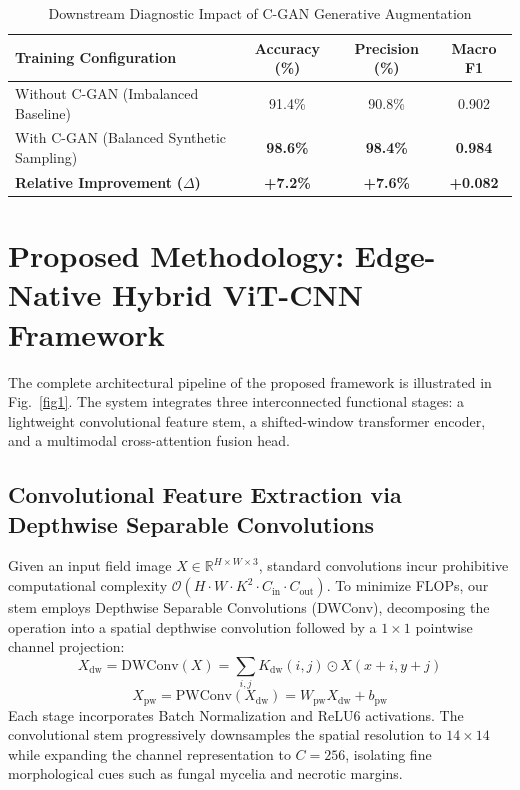\documentclass[conference]{IEEEtran}
\begin{document}
\begin{table}[htbp]
\caption{Downstream Diagnostic Impact of C-GAN Generative Augmentation}
\label{tab:cgan_ablation}
\centering
\footnotesize
\setlength{\tabcolsep}{3pt}
\renewcommand{\arraystretch}{1.15}

\begin{tabular}{|p{2.35cm}|c|c|c|}
\hline
\textbf{Training Configuration} &
\textbf{Accuracy (\%)} &
\textbf{Precision (\%)} &
\textbf{Macro F1} \\
\hline

Without C-GAN
(Imbalanced Baseline)
& 91.4\% & 90.8\% & 0.902 \\
\hline

With C-GAN
(Balanced Synthetic Sampling)
& \textbf{98.6\%}
& \textbf{98.4\%}
& \textbf{0.984} \\
\hline

\textbf{Relative Improvement}
\textbf{($\Delta$)}
& \textbf{+7.2\%}
& \textbf{+7.6\%}
& \textbf{+0.082} \\
\hline

\end{tabular}
\end{table}

\section{Proposed Methodology: Edge-Native Hybrid ViT-CNN Framework}
The complete architectural pipeline of the proposed framework is illustrated in Fig.~\ref{fig1}. The system integrates three interconnected functional stages: a lightweight convolutional feature stem, a shifted-window transformer encoder, and a multimodal cross-attention fusion head.

\subsection{Convolutional Feature Extraction via Depthwise Separable Convolutions}
Given an input field image $X \in \mathbb{R}^{H \times W \times 3}$, standard convolutions incur prohibitive computational complexity $\mathcal{O}(H \cdot W \cdot K^2 \cdot C_{\text{in}} \cdot C_{\text{out}})$. To minimize FLOPs, our stem employs Depthwise Separable Convolutions (DWConv), decomposing the operation into a spatial depthwise convolution followed by a $1 \times 1$ pointwise channel projection:
\begin{equation}
X_{\text{dw}} = \text{DWConv}(X) = \sum_{i,j} K_{\text{dw}}(i,j) \odot X(x+i, y+j)
\end{equation}
\begin{equation}
X_{\text{pw}} = \text{PWConv}(X_{\text{dw}}) = W_{\text{pw}} X_{\text{dw}} + b_{\text{pw}}
\end{equation}
Each stage incorporates Batch Normalization and ReLU6 activations. The convolutional stem progressively downsamples the spatial resolution to $14 \times 14$ while expanding the channel representation to $C = 256$, isolating fine morphological cues such as fungal mycelia and necrotic margins.
\end{document}
